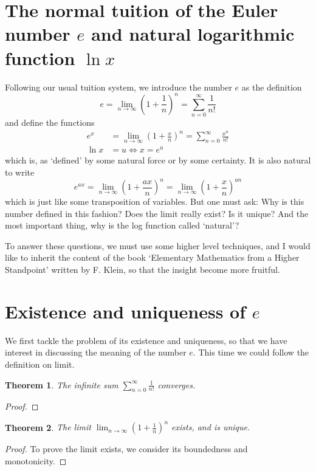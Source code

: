 \documentclass[12pt]{article}
\newtheorem*{theorem}{Theorem}
\begin{document}
    \section{The normal tuition of the Euler number $e$ and natural logarithmic function $\ln x$}
    Following our usual tuition system, we introduce the number $e$ as the definition $$e=\lim_{n\to \infty}(1+\frac{1}{n})^n=\sum_{n=0}^\infty \frac{1}{n!}$$ and define the functions \begin{align*}
        e^x&=\lim_{n\to \infty}(1+\frac{x}{n})^n=\sum_{n=0}^\infty \frac{x^n}{n!}\\
        \ln{x}&=u \iff x=e^u
    \end{align*}which is, as `defined' by some natural force or by some certainty. It is also natural to write $$e^{ax}=\lim_{n\to \infty}(1+\frac{ax}{n})^n=\lim_{n\to \infty}(1+\frac{x}{n})^{an}$$ which is just like some transposition of variables. But one must ask: Why is this number defined in this fashion? Does the limit really exist? Is it unique? And the most important thing, why is the log function called `natural'?

    To answer these questions, we must use some higher level techniques, and I would like to inherit the content of the book `Elementary Mathematics from a Higher Standpoint' written by F. Klein, so that the insight become more fruitful.

    \section{Existence and uniqueness of $e$}
    We first tackle the problem of its existence and uniqueness, so that we have interest in discussing the meaning of the number $e$. This time we could follow the definition on limit.

    

    \begin{theorem}
        The infinite sum $\sum_{n=0}^\infty \frac{1}{n!}$ converges.
    \end{theorem}
    \begin{proof}
        
    \end{proof}

    \begin{theorem}
        The limit $\lim_{n\to \infty}(1+\frac{1}{n})^n$ exists, and is unique.
    \end{theorem}
    \begin{proof}
        To prove the limit exists, we consider its boundedness and monotonicity. 
    \end{proof}
\end{document}
